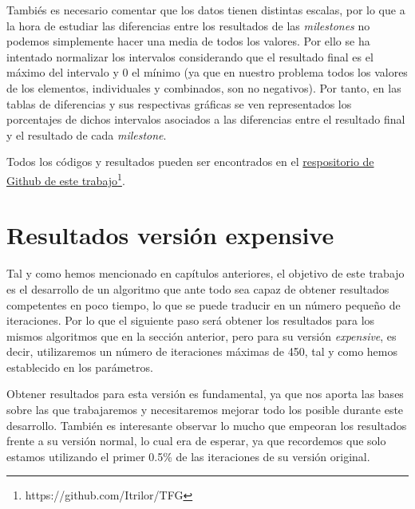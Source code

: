 Tambiés es necesario comentar que los datos tienen distintas escalas, por lo que a la hora de estudiar las diferencias entre los resultados de las \textit{milestones} no podemos simplemente hacer una media de todos los valores. 
Por ello se ha intentado normalizar los intervalos considerando que el resultado final es el máximo del intervalo y 0 el mínimo (ya que en nuestro problema todos los valores de los elementos, individuales y combinados, son no negativos). 
Por tanto, en las tablas de diferencias y sus respectivas gráficas se ven representados los porcentajes de dichos intervalos asociados a las diferencias entre el resultado final y el resultado de cada \textit{milestone}.

Todos los códigos y resultados pueden ser encontrados en el \href{https://github.com/Itrilor/TFG/tree/main}{respositorio de Github de este trabajo}\footnote{https://github.com/Itrilor/TFG}. 

%
%
%
%
%

\section{Resultados versión expensive}

Tal y como hemos mencionado en capítulos anteriores, el objetivo de este trabajo es el desarrollo de un algoritmo que ante todo sea capaz de obtener resultados competentes en poco tiempo, lo que se puede traducir en un número pequeño de iteraciones. 
Por lo que el siguiente paso será obtener los resultados para los mismos algoritmos que en la sección anterior, pero para su versión \textit{expensive}, es decir, utilizaremos un número de iteraciones máximas de 450, tal y como hemos establecido en los parámetros. 

Obtener resultados para esta versión es fundamental, ya que nos aporta las bases sobre las que trabajaremos y necesitaremos mejorar todo los posible durante este desarrollo. 
También es interesante observar lo mucho que empeoran los resultados frente a su versión normal, lo cual era de esperar, ya que recordemos que solo estamos utilizando el primer 0.5\% de las iteraciones de su versión original. 

